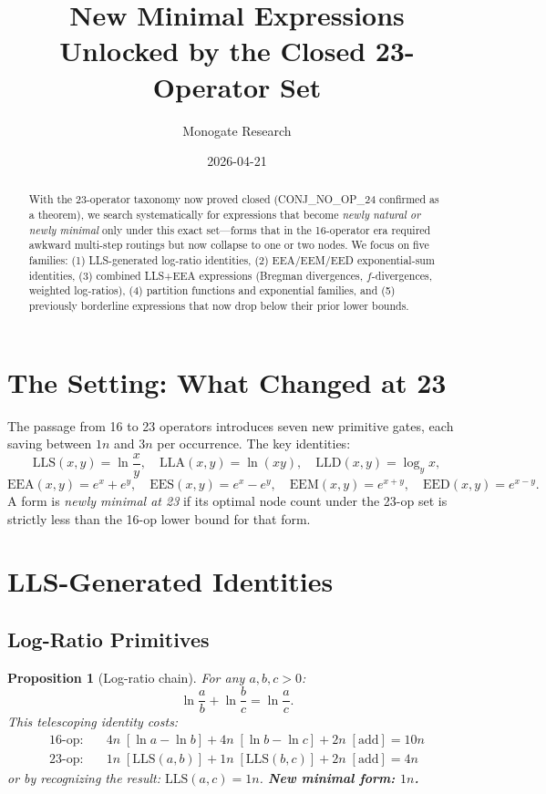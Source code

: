 \documentclass[11pt]{article}
\title{New Minimal Expressions Unlocked by the Closed 23-Operator Set}
\author{Monogate Research}
\date{2026-04-21}
\newtheorem{proposition}[theorem]{Proposition}
\begin{document}
\maketitle

\begin{abstract}
With the 23-operator taxonomy now proved closed (CONJ\_NO\_OP\_24 confirmed as a theorem),
we search systematically for expressions that become \emph{newly natural or newly minimal}
only under this exact set---forms that in the 16-operator era required awkward multi-step routings
but now collapse to one or two nodes.
We focus on five families: (1) LLS-generated log-ratio identities,
(2) EEA/EEM/EED exponential-sum identities, (3) combined LLS+EEA expressions
(Bregman divergences, $f$-divergences, weighted log-ratios),
(4) partition functions and exponential families,
and (5) previously borderline expressions that now drop below their prior lower bounds.
\end{abstract}

\section{The Setting: What Changed at 23}

The passage from 16 to 23 operators introduces seven new primitive gates, each saving between
$1n$ and $3n$ per occurrence. The key identities:
\[
\mathrm{LLS}(x,y)=\ln\frac{x}{y},\quad
\mathrm{LLA}(x,y)=\ln(xy),\quad
\mathrm{LLD}(x,y)=\log_y x,
\]
\[
\mathrm{EEA}(x,y)=e^x+e^y,\quad
\mathrm{EES}(x,y)=e^x-e^y,\quad
\mathrm{EEM}(x,y)=e^{x+y},\quad
\mathrm{EED}(x,y)=e^{x-y}.
\]
A form is \emph{newly minimal at 23} if its optimal node count under the 23-op set is strictly less
than the 16-op lower bound for that form.

\section{LLS-Generated Identities}

\subsection{Log-Ratio Primitives}

\begin{proposition}[Log-ratio chain]
For any $a,b,c>0$:
\[
\ln\frac{a}{b} + \ln\frac{b}{c} = \ln\frac{a}{c}.
\]
This telescoping identity costs:
\begin{align*}
\text{16-op:} &\quad 4n\;[\ln a-\ln b]+4n\;[\ln b-\ln c]+2n\;[\text{add}]=10n\\
\text{23-op:} &\quad 1n\;[\mathrm{LLS}(a,b)]+1n\;[\mathrm{LLS}(b,c)]+2n\;[\text{add}]=4n
\end{align*}
or by recognizing the result: $\mathrm{LLS}(a,c)=1n$.
\textbf{New minimal form: $1n$.}
\end{proposition}
\end{document}
